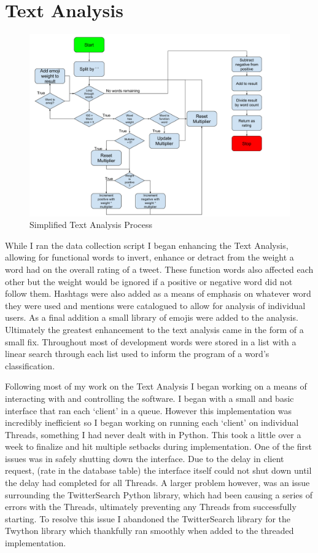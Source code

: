 \documentclass[12pt,a4paper]{report}
\begin{document}
  \section{Text Analysis}
  \begin{figure}[!htb]
    \centering
    \includegraphics[width=\textwidth]{textAnalysis}
    \caption{Simplified Text Analysis Process}
    \label{fig:activityDiagram}
  \end{figure}
  While I ran the data collection script I began enhancing the Text Analysis, allowing for functional words to invert, enhance or detract from the weight a word had on the overall rating of a tweet. These function words also affected each other but the weight would be ignored if a positive or negative word did not follow them. Hashtags were also added as a means of emphasis on whatever word they were used and mentions were catalogued to allow for analysis of individual users. As a final addition a small library of emojis were added to the analysis. Ultimately the greatest enhancement to the text analysis came in the form of a small fix. Throughout most of development words were stored in a list with a linear search through each list used to inform the program of a word’s classification.  
  \par
  Following most of my work on the Text Analysis I began working on a means of interacting with and controlling the software. I began with a small and basic interface that ran each ‘client’ in a queue. However this implementation was incredibly inefficient so I began working on running each ‘client’ on individual Threads, something I had never dealt with in Python. This took a little over a week to finalize and hit multiple setbacks during implementation. One of the first issues was in safely shutting down the interface. Due to the delay in client request, (rate in the database table) the interface itself could not shut down until the delay had completed for all Threads. A larger problem however, was an issue surrounding the TwitterSearch\cite{TwitterSearch} Python library, which had been causing a series of errors with the Threads, ultimately preventing any Threads from successfully starting. To resolve this issue I abandoned the TwitterSearch\cite{TwitterSearch} library for the Twython\cite{Twython} library which thankfully ran smoothly when added to the threaded implementation.
\end{document}
